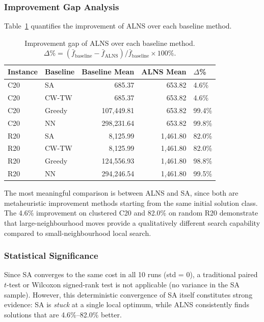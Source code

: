 \documentclass[11pt]{article}
\begin{document}
\subsubsection{Improvement Gap Analysis}

Table~\ref{tab:gap} quantifies the improvement of ALNS over each baseline method.

\begin{table}[htbp]
\centering
\begin{tabular}{@{}llrrl@{}}
\toprule
\textbf{Instance} & \textbf{Baseline} & \textbf{Baseline Mean} & \textbf{ALNS Mean} & \textbf{$\Delta$\%} \\
\midrule
C20 & SA & 685.37 & 653.82 & 4.6\% \\
C20 & CW-TW & 685.37 & 653.82 & 4.6\% \\
C20 & Greedy & 107,449.81 & 653.82 & 99.4\% \\
C20 & NN & 298,231.64 & 653.82 & 99.8\% \\
\midrule
R20 & SA & 8,125.99 & 1,461.80 & 82.0\% \\
R20 & CW-TW & 8,125.99 & 1,461.80 & 82.0\% \\
R20 & Greedy & 124,556.93 & 1,461.80 & 98.8\% \\
R20 & NN & 294,246.54 & 1,461.80 & 99.5\% \\
\bottomrule
\end{tabular}
\caption{Improvement gap of ALNS over each baseline method. $\Delta\% = (\bar{f}_{\text{baseline}} - \bar{f}_{\text{ALNS}}) / \bar{f}_{\text{baseline}} \times 100\%$.}
\label{tab:gap}
\end{table}

The most meaningful comparison is between ALNS and SA, since both are metaheuristic improvement methods starting from the same initial solution class. The 4.6\% improvement on clustered C20 and 82.0\% on random R20 demonstrate that large-neighbourhood moves provide a qualitatively different search capability compared to small-neighbourhood local search.

\subsubsection{Statistical Significance}

Since SA converges to the same cost in all 10 runs (std = 0), a traditional paired $t$-test or Wilcoxon signed-rank test is not applicable (no variance in the SA sample). However, this deterministic convergence of SA itself constitutes strong evidence: SA is \emph{stuck} at a single local optimum, while ALNS consistently finds solutions that are 4.6\%--82.0\% better.
\end{document}
